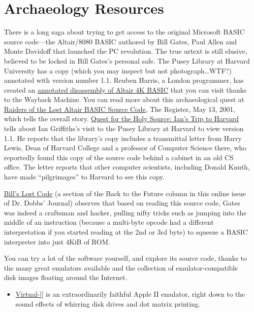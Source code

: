 \documentclass{article}
\begin{document}
\section{Archaeology Resources}

There is a long saga about trying to get access to the original
Microsoft BASIC source code---the Altair/8080 BASIC authored by Bill
Gates, Paul Allen and Monte Davidoff that launched the PC revolution.
The true urtext is still elusive, believed to be locked in Bill Gates's
personal safe.
The Pusey Library at Harvard University has a copy (which you may
inspect but not photograph\ldots{}WTF?) annotated with version number
1.1.
Reuben Harris, a London programmer, has created an
\href{http://web.archive.org/web/20011211233332/www.rjh.org.uk/altair/4k/index2.html}{annotated
disassembly of Altair 4K BASIC} that you can visit thanks to the
Wayback Machine.
You can read more about this archaeological quest at
\href{http://www.theregister.co.uk/2001/05/13/raiders_of_the_lost_altair/}{Raiders
of the Lost Altair BASIC Source Code}, The Register, May 13, 2001,
which tells the overall story.
\href{http://www.interact-sw.co.uk/altair/other\%20versions/ian.htm}{Quest
for the Holy Source: Ian's Trip to Harvard} tells about Ian
Griffiths's visit to the Pusey Library at Harvard to view version
1.1.
He reports that the library's copy includes a transmittal letter from
Harry Lewis, Dean of Harvard College and a professor of Computer
Science there, who reportedly found this copy of the source code behind
a cabinet in an old CS office.
The letter reports that other computer scientists, including Donald
Knuth, have made ``pilgrimages'' to Harvard to see this copy.

\href{http://www.drdobbs.com/back-to-the-future/184404733}{Bill's
  Lost Code} (a section of the Back to the Future column in this online
issue of Dr. Dobbs' Journal) observes that based on reading this source
code, Gates was indeed a craftsman and hacker, pulling nifty tricks such
as jumping into the middle of an instruction (because a multi-byte
opcode had a different interpretation if you started reading at the 2nd
or 3rd byte) to squeeze a BASIC interpreter into just 4KiB of ROM.

You can try a lot of the software yourself, and explore
its source code, thanks to the many great emulators available and the
collection of emulator-compatible disk images floating around the Internet.

\begin{itemize}
\item \href{http://virtualii.com}{Virtual-][} is an extraordinarily
  faithful Apple II emulator, right down to the sound effects of
  whirring disk drives and dot matrix printing.

\end{itemize}
\end{document}

